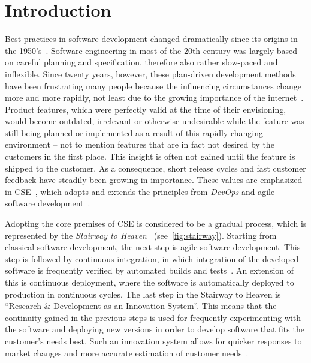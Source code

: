 %
\chapter{Introduction}
\label{ch:intro}





Best practices in software development changed dramatically since its origins in the 1950's~\cite{boehm2006view}.
Software engineering in most of the 20th century was largely based on careful planning and specification, therefore also rather slow-paced and inflexible.
Since twenty years, however, these plan-driven development methods have been frustrating many people because the influencing circumstances change more and more rapidly, not least due to the growing importance of the internet~\cite{Williams2003}.
Product features, which were perfectly valid at the time of their envisioning, would become outdated, irrelevant or otherwise undesirable while the feature was still being planned or implemented as a result of this rapidly changing environment -- not to mention features that are in fact not desired by the customers in the first place.
This insight is often not gained until the feature is shipped to the customer.
As a consequence, short release cycles and fast customer feedback have steadily been growing in importance.
These values are emphasized in \acf{CSE}~\cite{Bosch2014}, which adopts and extends the principles from \emph{DevOps} and agile software development~\cite{Fitzgerald2017,fowler2001agile}.

Adopting the core premises of \ac{CSE} is considered to be a gradual process, which is represented by the \emph{Stairway to Heaven}~\cite{Olsson2012} (see~\cref{fig:stairway}).
Starting from classical software development, the next step is agile software development.
This step is followed by continuous integration, in which integration of the developed software is frequently verified by automated builds and tests~\cite[Maintaining Model Integrity, pp.~341~ff.]{evans2004domain}.
An extension of this is continuous deployment, where the software is automatically deployed to production in continuous cycles.
The last step in the Stairway to Heaven is ``Research \& Development as an Innovation System''.
This means that the continuity gained in the previous steps is used for frequently experimenting with the software and deploying new versions in order to develop software that fits the customer's needs best.
Such an innovation system allows for quicker responses to market changes and more accurate estimation of customer needs~\cite{Olsson2012}.

